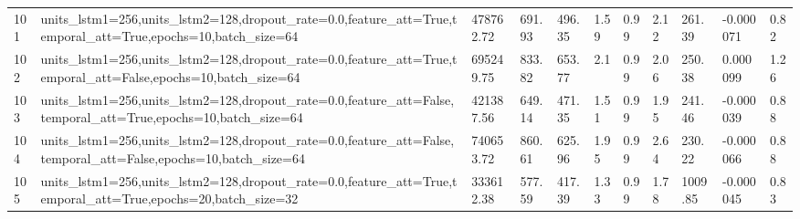 \begin{longtable}{C{0.8cm} L{2cm} C{1.15cm} C{1.15cm} C{1.15cm} C{1.15cm} C{0.85cm} C{1.25cm} C{1.2cm} C{1.5cm} C{1.0cm}}
101 & units\_lstm1=256,\newline units\_lstm2=128,\newline dropout\_rate=0.0,\newline feature\_att=True,\newline temporal\_att=True,\newline epochs=10,\newline batch\_size=64 & 478762.72 & 691.93 & 496.35 & 1.59 & 0.99 & 2.12 & 261.39 & -0.000071 & 0.82 \\
102 & units\_lstm1=256,\newline units\_lstm2=128,\newline dropout\_rate=0.0,\newline feature\_att=True,\newline temporal\_att=False,\newline epochs=10,\newline batch\_size=64 & 695249.75 & 833.82 & 653.77 & 2.1 & 0.99 & 2.06 & 250.38 & 0.000099 & 1.26 \\
103 & units\_lstm1=256,\newline units\_lstm2=128,\newline dropout\_rate=0.0,\newline feature\_att=False,\newline temporal\_att=True,\newline epochs=10,\newline batch\_size=64 & 421387.56 & 649.14 & 471.35 & 1.51 & 0.99 & 1.95 & 241.46 & -0.000039 & 0.88 \\
104 & units\_lstm1=256,\newline units\_lstm2=128,\newline dropout\_rate=0.0,\newline feature\_att=False,\newline temporal\_att=False,\newline epochs=10,\newline batch\_size=64 & 740653.72 & 860.61 & 625.96 & 1.95 & 0.99 & 2.64 & 230.22 & -0.000066 & 0.88 \\
105 & units\_lstm1=256,\newline units\_lstm2=128,\newline dropout\_rate=0.0,\newline feature\_att=True,\newline temporal\_att=True,\newline epochs=20,\newline batch\_size=32 & 333612.38 & 577.59 & 417.39 & 1.33 & 0.99 & 1.78 & 1009.85 & -0.000045 & 0.83 \\

\end{longtable}
